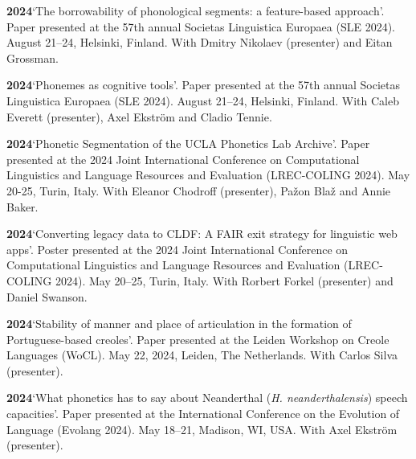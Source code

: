 \documentclass[11pt]{article}
\newcommand{\hangpara}{
 \setlength{\parindent}{0in} %
 \hangindent=0.42in %
}
\begin{document}
\hangpara
\vskip 6pt
{\bf 2024}\hspace{1ex}`The borrowability of phonological segments: a feature-based approach'. Paper presented at the  57th annual Societas Linguistica Europaea (SLE 2024). August 21--24, Helsinki, Finland. With Dmitry Nikolaev (presenter) and Eitan Grossman. %

\hangpara
\vskip 6pt
{\bf 2024}\hspace{1ex}`Phonemes as cognitive tools'. Paper presented at the 57th annual Societas Linguistica Europaea (SLE 2024). August 21--24, Helsinki, Finland. With Caleb Everett (presenter), Axel Ekström and Cladio Tennie. %

\hangpara
\vskip 6pt
{\bf 2024}\hspace{1ex}`Phonetic Segmentation of the UCLA Phonetics Lab Archive'. Paper presented at the 2024 Joint International Conference on Computational Linguistics and Language Resources and Evaluation (LREC-COLING 2024). May 20-25, Turin, Italy. With Eleanor Chodroff (presenter), Pažon Blaž and Annie Baker. %

\hangpara
\vskip 6pt
{\bf 2024}\hspace{1ex}`Converting legacy data to CLDF: A FAIR exit strategy for linguistic web apps'. Poster presented at the 2024 Joint International Conference on Computational Linguistics and Language Resources and Evaluation (LREC-COLING 2024). May 20--25, Turin, Italy. With Rorbert Forkel (presenter) and Daniel Swanson. %

\hangpara
\vskip 6pt
{\bf 2024}\hspace{1ex}`Stability of manner and place of articulation in the formation of Portuguese-based creoles'. Paper presented at the Leiden Workshop on Creole Languages (WoCL). May 22, 2024, Leiden, The Netherlands. With Carlos Silva (presenter). %

\hangpara
\vskip 6pt
{\bf 2024}\hspace{1ex}`What phonetics has to say about Neanderthal (\textit{H. neanderthalensis}) speech capacities'. Paper presented at the International Conference on the Evolution of Language (Evolang 2024). May 18--21, Madison, WI, USA. With Axel Ekström (presenter).
\end{document}
